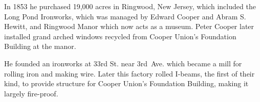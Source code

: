 \documentclass{article}
\begin{document}
\begin{minipage}[t]{0.46\linewidth}
\begin{enumList}
\item In 1853 he purchased 19,000 acres in Ringwood, New Jersey, which included
the { Long Pond Ironworks}, which was managed by
Edward Cooper and Abram S. Hewitt, and { Ringwood Manor}
which now acts as a museum. Peter Cooper later installed { grand arched windows recycled from Cooper Union's Foundation Building}
at the manor.

\item He founded an ironworks at 33rd St. near 3rd~Ave. which became a
mill for rolling iron and making wire. Later this factory { rolled I-beams}, the first of their kind, to provide structure for
{ Cooper Union's Foundation Building}, making it largely
{ fire-proof}.

\setcounter{enumTemp}{\value{enumListi}}
\end{enumList}
\end{minipage}
\vspace*{\fill}
\end{document}
